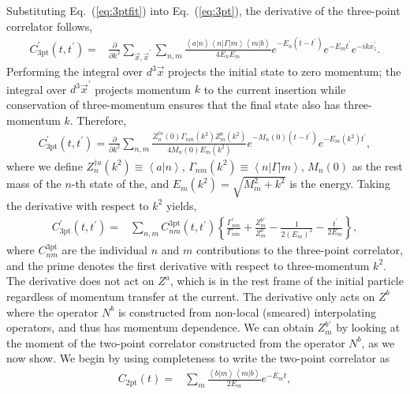 \documentclass{PoS}
\begin{document}
Substituting Eq.~(\ref{eq:3ptfit}) into Eq.~(\ref{eq:3pt}), the derivative of the three-point correlator follows,
\begin{align}
C^\prime_{\text{3pt}}(t, t^\prime) = & \frac{\partial}{\partial k^2} \sum_{\vec{x},\vec{x}^\prime} \sum_{n,m} \frac{\left<a | n\right>\left<n| \Gamma |m\right>\left<m | b\right>}{4E_n E_m} e^{-E_n(t - t^\prime)} e^{-E_m t^\prime} e^{-ikx^\prime_z}.
\end{align}
Performing the integral over $d^3\vec{x}$ projects the initial state to zero momentum; the integral over $d^3 \vec{x}^\prime$ projects momentum $k$ to the current insertion while conservation of three-momentum ensures that the final state also has three-momentum $k$. Therefore,
\begin{align}
C^\prime_{\text{3pt}}(t, t^\prime) 
= \frac{\partial}{\partial k^2} \sum_{n,m} \frac{Z_n^{\dagger a}(0) \Gamma_{nm}(k^2)Z_m^b(k^2)}{4 M_n(0) E_m(k^2)} e^{-M_n(0)(t - t^\prime)} e^{-E_m(k^2) t^\prime},
\end{align}
where we define $Z_n^{\dagger a}(k^2) \equiv\left<a|n\right>$, $\Gamma_{nm}(k^2) \equiv \left<n| \Gamma | m \right>$, $M_n(0)$ as the rest mass of the $n$-th state of the, and $E_m(k^2) = \sqrt{M_m^2+k^2}$ is the energy. Taking the derivative with respect to $k^2$ yields,
\begin{align}
C^\prime_{\text{3pt}}(t, t^\prime) = &\sum_{n,m} C^{\text{3pt}}_{nm}(t,t^\prime)\left\{ \frac{\Gamma_{nm}^\prime}{\Gamma_{nm}} + \frac{Z^{b\prime}_m}{Z^b_m} - \frac{1}{2(E_m)^2} -\frac{t^\prime}{2E_m}\right\} \label{3ptmomentfit},
\end{align}
where $C_{nm}^{\text{3pt}}$ are the individual $n$ and $m$ contributions to the three-point correlator, and the prime denotes the first derivative with respect to three-momentum $k^2$. The derivative does not act on $Z^a$, which is in the rest frame of the initial particle regardless of momentum transfer at the current. The derivative only acts on $Z^b$ where the operator $N^b$ is constructed from non-local (smeared) interpolating operators, and thus has momentum dependence. We can obtain $Z_m^{b\prime}$ by looking at the moment of the two-point correlator constructed from the operator $N^b$, as we now show. We begin by using completeness to write the two-point correlator as
\begin{align}
C_{\text{2pt}}(t)= & \sum_m \frac{\left<b | m\right>\left<m | b\right>}{2E_m} e^{-E_m t} \label{eq:2ptfit},
\end{align}
\end{document}
